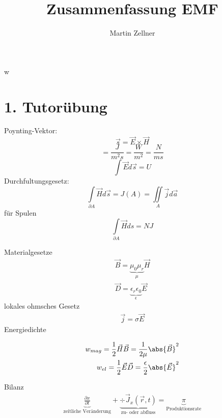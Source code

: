 w\documentclass[]{article}
\begin{document}
\title{Zusammenfassung EMF}
\author{Martin Zellner}

\section*{1. Tutorübung}

Poynting-Vektor: 
\begin{equation}
	\vec s = \vec E \times \vec H
\end{equation}
\begin{equation}
	[\vec s] = \frac{J}{m^2 s} = \frac{W}{m^2} = \frac{N}{m s}
\end{equation}
\begin{equation}
	\int \vec E d \vec s = U
\end{equation}
Durchfultungsgesetz:
\begin{equation}
	\int \limits_{\partial A} \vec H d \vec s = J(A) = \iint \limits_{A} \vec j d \vec a
\end{equation}
für Spulen
\begin{equation}
\int \limits_{\partial A} \vec H  d s = N J
\end{equation}

Materialgesetze
\begin{eqnarray}
	\vec B = \underbrace{\mu_0 \mu_r}_{\mu} \vec H \\
	\vec D = \underbrace{\epsilon_r \epsilon_0}_{\epsilon} \vec E
\end{eqnarray}
lokales ohmsches Gesetz
\begin{eqnarray}
	\vec j = \sigma \vec E
\end{eqnarray}
Energiedichte 

\begin{eqnarray}
	w_{mag} = \frac 1 2 \vec H \vec B = \frac{1}{2\mu} \abs{\vec B}^2 \\
	w_{el} = \frac 1 2 \vec E \vec D = \frac \epsilon 2 \abs{\vec E}^2
\end{eqnarray}

Bilanz
\begin{eqnarray}
	\underbrace{\frac{\partial x}{\partial t}}_{\text{zeitliche Veränderung}} + \underbrace{\div \vec J_x (\vec r, t)}_{\text{zu- oder abfluss}} = \underbrace{\pi}_{\text{Produktionsrate}} 
\end{eqnarray}
\end{document}
